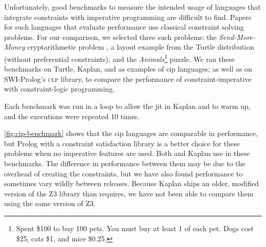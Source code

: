 Unfortunately, good benchmarks to measure the intended usage of
languages that integrate constraints with imperative programming are
difficult to find. Papers for such languages that evaluate performance
use classical constraint solving problems. For our comparison, we
selected three such problems: the \emph{Send-More-Money}
cryptarithmetic problem
\cite{dudeney1924send}, a layout example from the Turtle
distribution (without preferential constraints), and the
\emph{Animals}\footnote{Spent \$100 to buy 100 pets. You must buy at
  least 1 of each pet. Dogs cost \$25, cats \$1, and mice
  \$0.25.} puzzle. We ran these benchmarks on Turtle, Kaplan,
and \toolname as examples of \ac{cip} languages; as well as on
SWI-Prolog's \textsc{clp} library, to compare the performance of
constraint-imperative with constraint-logic programming.

Each benchmark was run in a loop to allow the \ac{jit} in Kaplan and
\toolname to warm up, and the executions were repeated 10 times.



\autoref{fig:cip-benchmark} shows that the \ac{cip} languages are
comparable in performance, but Prolog with a constraint satisfaction
library is a better choice for these problems when no imperative
features are used. Both \toolname and Kaplan use \zthree in these
benchmarks. The difference in performance between them may be due to
the overhead of creating the constraints, but we have also found
\zthree performance to sometimes vary wildly between releases. Because
Kaplan ships an older, modified version of the Z3 library than
\toolname requires, we have not been able to compare them using the same
version of Z3.

